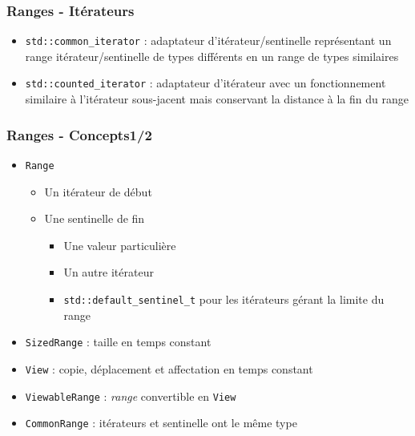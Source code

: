 \documentclass[C++.tex]{subfiles}
\begin{document}
\begin{frame}[fragile]
	\frametitle{Ranges - Itérateurs}
	\begin{itemize}
		\item \lstinline|std::common_iterator| : adaptateur d'itérateur/sentinelle représentant un range itérateur/sentinelle de types différents en un range de types similaires


		\item \lstinline|std::counted_iterator| : adaptateur d'itérateur avec un fonctionnement similaire à l'itérateur sous-jacent mais conservant la distance à la fin du range
	\end{itemize}
\end{frame}

\begin{frame}[fragile]
	\frametitle{Ranges - Concepts\titlehfill{}1/2}
	\begin{itemize}
		\item \lstinline|Range|
		\begin{itemize}
			\item Un itérateur de début
			\item Une sentinelle de fin
			\begin{itemize}
				\item Une valeur particulière
				\item Un autre itérateur


				\item \lstinline|std::default_sentinel_t| pour les itérateurs gérant la limite du range

			\end{itemize}
		\end{itemize}

		\item \lstinline|SizedRange| : taille en temps constant
		\item \lstinline|View| : copie, déplacement et affectation en temps constant
		\item \lstinline|ViewableRange| : \textit{range} convertible en \lstinline|View|
		\item \lstinline|CommonRange| : itérateurs et sentinelle ont le même type
	\end{itemize}
\end{frame}
\end{document}
